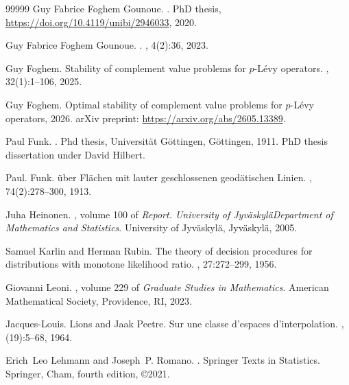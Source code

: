 \documentclass[12pt, reqno]{amsart}%
\theoremstyle{plain}  %
\theoremstyle{definition}  %
\theoremstyle{remark}
\numberwithin{equation}{section}
\begin{document}
{\begin{thebibliography}{99999}
{Guy Fabrice} {Foghem Gounoue}.
.
\newblock PhD thesis, \url{https://doi.org/10.4119/unibi/2946033}, 2020.

{Guy Fabrice} {Foghem Gounoue}.
.
, 4(2):36, 2023.

Guy Foghem.
\newblock Stability of complement value problems for {$p$}-{L}\'evy operators.
, 32(1):1--106, 2025.

Guy Foghem.
\newblock Optimal stability of complement value problems for $p$-{L}{\'e}vy
  operators, 2026.
\newblock arXiv preprint: \url{https://arxiv.org/abs/2605.13389}.

Paul Funk.
.
\newblock Phd thesis, Universit{\"a}t G{\"o}ttingen, G{\"o}ttingen, 1911.
\newblock PhD thesis dissertation under David Hilbert.

Paul. Funk.
\newblock \"uber {F}l\"achen mit lauter geschlossenen geod\"atischen {L}inien.
, 74(2):278--300, 1913.

Juha Heinonen.
, volume 100 of {\em Report.
  University of Jyv{\"a}skyl{\"a}Department of Mathematics and Statistics}.
\newblock University of Jyv{\"a}skyl{\"a}, Jyv{\"a}skyl{\"a}, 2005.

Samuel Karlin and Herman Rubin.
\newblock The theory of decision procedures for distributions with monotone
  likelihood ratio.
, 27:272--299, 1956.

Giovanni Leoni.
, volume 229 of
  {\em Graduate Studies in Mathematics}.
\newblock American Mathematical Society, Providence, RI, 2023.

Jacques-Louis. Lions and Jaak Peetre.
\newblock Sur une classe d'espaces d'interpolation.
, (19):5--68, 1964.

Erich~Leo Lehmann and Joseph~P. Romano.
.
\newblock Springer Texts in Statistics. Springer, Cham, fourth edition,
  \copyright 2021.


\end{thebibliography}}
\end{document}
